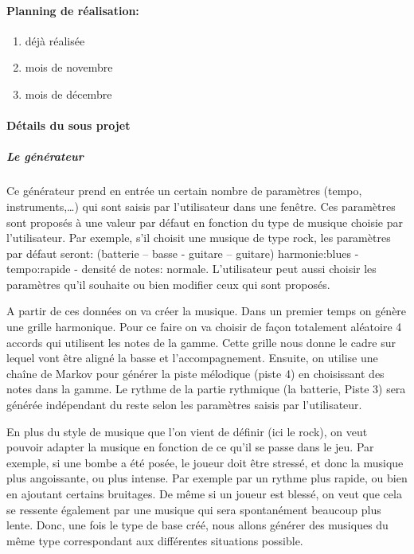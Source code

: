 \documentclass[a4paper,10pt]{article}
\begin{document}
\paragraph{Planning de réalisation:}
\begin{enumerate}[1-]
 \item déjà réalisée
 \item mois de novembre
 \item mois de décembre
\end{enumerate}
\paragraph{Détails du sous projet}
\subparagraph{Le générateur}
Ce générateur prend en entrée un certain nombre de paramètres (tempo, instruments,…)  qui sont saisis par l’utilisateur dans une fenêtre. Ces paramètres sont proposés à une valeur par défaut en fonction du type de musique choisie par l’utilisateur. Par exemple, s’il choisit une musique de type rock, les paramètres par défaut seront: {(batterie – basse - guitare – guitare)  harmonie:blues - tempo:rapide - densité de notes: normale}. 
L’utilisateur peut aussi choisir les paramètres qu’il souhaite ou bien modifier ceux qui sont proposés. 

A partir de ces données on va créer la musique. 
Dans un premier temps  on génère une grille harmonique. Pour ce faire on va choisir de façon totalement aléatoire 4 accords qui utilisent les notes de la gamme. Cette grille  nous donne le cadre sur  lequel vont être aligné la basse et l’accompagnement.
Ensuite, on utilise une chaîne de Markov pour générer  la piste mélodique (piste 4)  en choisissant des notes dans la gamme. Le rythme de la partie rythmique (la batterie,  Piste 3)  sera générée indépendant du reste selon les paramètres saisis par l’utilisateur. 


En plus du style de musique que l’on vient de définir (ici le rock), on veut pouvoir adapter la musique en fonction de ce qu’il se passe dans le jeu. Par exemple, si une bombe a été posée, le joueur doit être stressé, et donc la musique plus angoissante, ou plus intense. Par exemple par un rythme plus rapide, ou bien en ajoutant certains bruitages. De même si un joueur est blessé, on veut que cela se ressente également par une musique qui sera spontanément beaucoup plus lente.  
Donc, une fois le type de base créé, nous allons générer des musiques du même type correspondant aux différentes situations possible. 
\end{document}
